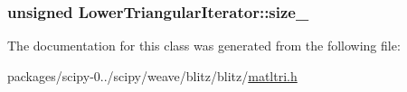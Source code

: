 \subsubsection[{size\+\_\+}]{\setlength{\rightskip}{0pt plus 5cm}unsigned Lower\+Triangular\+Iterator\+::size\+\_\+\hspace{0.3cm}{\ttfamily [protected]}}\label{classLowerTriangularIterator_a4e7c1d15a20473697c3d5f50bbe30048}


The documentation for this class was generated from the following file\+:\begin{DoxyCompactItemize}
\item 
packages/scipy-\/0../scipy/weave/blitz/blitz/\hyperlink{matltri_8h}{matltri.\+h}\end{DoxyCompactItemize}

